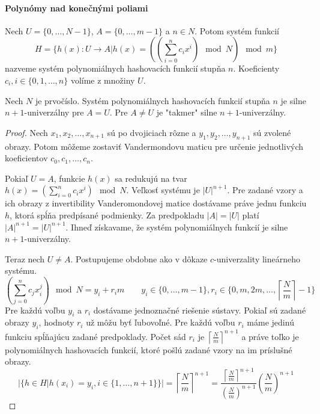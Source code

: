 \paragraph{Polynómy nad konečnými poliami}
\begin{definition}
Nech $U = \{0, \dots, N - 1 \}$, $A = \{0, \dots, m - 1\}$ a $n \in N$. Potom systém funkcií 
\[ H = \{h(x): U \rightarrow A | h(x) = ((\displaystyle \sum_{i=0}^{n} c_i x^i ) \mod N) \mod m\} \]
nazveme systém polynomiálnych hashovacích funkcií stupňa $n$. Koeficienty $c_i, i \in \{0, 1, \dots, n\}$ volíme z množiny $U$.
\end{definition}
\begin{remark}
Nech $N$ je prvočíslo. Systém polynomiálnych hashovacích funkcií stupňa $n$ je silne $n + 1$-univerzálny pre $A = U$. Pre $A \neq U$ je "takmer" silne $n + 1$-univerzálny.
\end{remark}
\begin{proof}
Nech $x_1, x_2, \dots, x_{n+1}$ sú po dvojiciach rôzne a $y_1, y_2, \dots, y_{n+1}$ sú zvolené obrazy. Potom môžeme zostaviť Vandermondovu maticu pre určenie jednotlivých koeficientov $c_0, c_1, \dots, c_n$.

Pokiaľ $U = A$, funkcie $h(x)$ sa redukujú na tvar $h(x) = (\displaystyle \sum_{i=0}^{n} c_i x^i ) \mod N$. Veľkosť systému je ${|U|}^{n+1}$. Pre zadané vzory a ich obrazy z invertibility Vanderomondovej matice dostávame práve jednu funkciu $h$, ktorá spĺňa predpísané podmienky. Za predpokladu $|A| = |U|$ platí ${|A|}^{n+1} = {|U|}^{n+1}$. Ihneď získavame, že systém polynomiálnych funkcií je silne $n+1$-univerzálny.

Teraz nech $U \neq A$. Postupujeme obdobne ako v dôkaze $c$-univerzality lineárneho systému.
\begin{displaymath}
(\displaystyle \sum_{j=0}^{n} c_j x_{i}^{j} ) \mod N = {y}_i + {r_i}{m} \qquad {y}_i \in \{0, \dots, m - 1 \}, r_i \in \{0, m, 2m, \dots, \left\lceil \frac{N}{m} \right\rceil - 1\}
\end{displaymath}
Pre každú voľbu ${y}_i$ a $r_i$ dostávame jednoznačné riešenie sústavy. Pokiaľ sú zadané obrazy $y_i$, hodnoty $r_i$ už môžu byť ľubovoľné. Pre každú voľbu $r_i$ máme jedinú funkciu spĺňajúcu zadané predpoklady. Počet sád $r_i$ je ${\left\lceil \frac{N}{m} \right\rceil}^{n + 1}$ a práve toľko je polynomiálnych hashovacích funkcií, ktoré pošlú zadané vzory na im príslušné obrazy.
\begin{displaymath}
|\{h \in H | h(x_i) = y_i, i \in \{1, \dots, n + 1\}\}| = {\left\lceil \frac{N}{m} \right\rceil}^{n + 1} = \frac{{\left\lceil \frac{N}{m} \right\rceil}^{n + 1}}{(\frac{N}{m})^{n+1}}\left(\frac{N}{m}\right)^{n+1}
\end{displaymath}
\end{proof}


